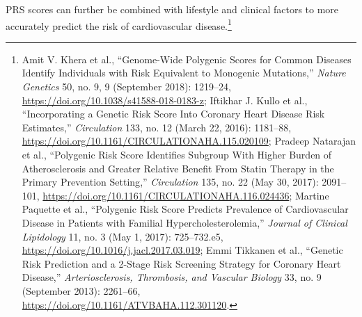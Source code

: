 \documentclass[
  9pt,
]{book}
\begin{document}
PRS scores can further be combined with lifestyle and clinical factors to more accurately predict the risk of cardiovascular disease.\footnote{Amit V. Khera et al., {``Genome-Wide Polygenic Scores for Common Diseases Identify Individuals with Risk Equivalent to Monogenic Mutations,''} \emph{Nature Genetics} 50, no. 9, 9 (September 2018): 1219--24, \url{https://doi.org/10.1038/s41588-018-0183-z}; Iftikhar J. Kullo et al., {``Incorporating a {Genetic Risk Score Into Coronary Heart Disease Risk Estimates},''} \emph{Circulation} 133, no. 12 (March 22, 2016): 1181--88, \url{https://doi.org/10.1161/CIRCULATIONAHA.115.020109}; Pradeep Natarajan et al., {``Polygenic {Risk Score Identifies Subgroup With Higher Burden} of {Atherosclerosis} and {Greater Relative Benefit From Statin Therapy} in the {Primary Prevention Setting},''} \emph{Circulation} 135, no. 22 (May 30, 2017): 2091--101, \url{https://doi.org/10.1161/CIRCULATIONAHA.116.024436}; Martine Paquette et al., {``Polygenic Risk Score Predicts Prevalence of Cardiovascular Disease in Patients with Familial Hypercholesterolemia,''} \emph{Journal of Clinical Lipidology} 11, no. 3 (May 1, 2017): 725--732.e5, \url{https://doi.org/10.1016/j.jacl.2017.03.019}; Emmi Tikkanen et al., {``Genetic {Risk Prediction} and a 2-{Stage Risk Screening Strategy} for {Coronary Heart Disease},''} \emph{Arteriosclerosis, Thrombosis, and Vascular Biology} 33, no. 9 (September 2013): 2261--66, \url{https://doi.org/10.1161/ATVBAHA.112.301120}.}
\end{document}
